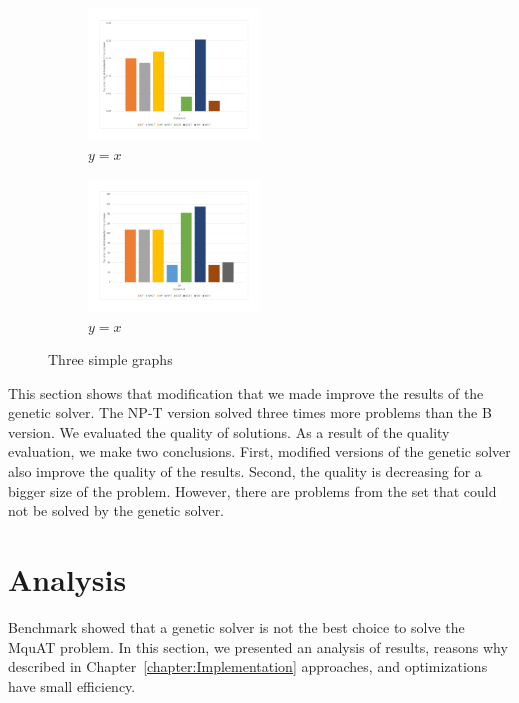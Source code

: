 \begin{figure}
	\centering
	\begin{subfigure}
		\centering
		\includegraphics[width=0.5\textwidth]{images/EnergyDeviationSmallProblem.pdf}
		\caption{$y=x$}
		\label{fig:SmallProblemEnergy}
	\end{subfigure}
\hfill
	\begin{subfigure}
		\centering
		\includegraphics[width=0.5\textwidth]{images/EnergyDeviationMediumProblem.pdf}
		\caption{$y=x$}
		\label{fig:MediumProblemEnergy}
	\end{subfigure}	
	\caption{Three simple graphs}
	\label{fig:SmallMediumProblemEnergy}	
\end{figure}


This section shows that modification that we made improve the results of the genetic solver. The NP-T version solved three times more problems than the B version. We evaluated the quality of solutions. As a result of the quality evaluation, we make two conclusions. First, modified versions of the genetic solver also improve the quality of the results. Second, the quality is decreasing for a bigger size of the problem.
However, there are problems from the set that could not be solved by the genetic solver.


\section{Analysis}

Benchmark showed that a genetic solver is not the best choice to solve the MquAT problem.
In this section, we presented an analysis of results, reasons why described in Chapter~\ref{chapter:Implementation} approaches, and optimizations have small efficiency.

